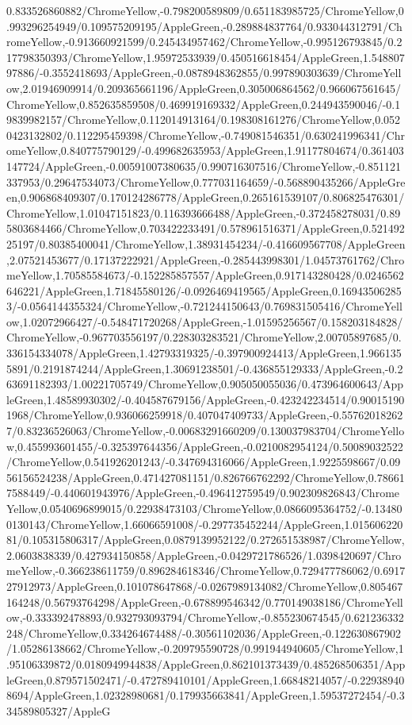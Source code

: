 {\begin{tikzternal}
0.833526860882/ChromeYellow,-0.798200589809/0.651183985725/ChromeYellow,0.993296254949/0.109575209195/AppleGreen,-0.289884837764/0.933044312791/ChromeYellow,-0.913660921599/0.245434957462/ChromeYellow,-0.995126793845/0.217798350393/ChromeYellow,1.95972533939/0.450516618454/AppleGreen,1.54880797886/-0.3552418693/AppleGreen,-0.0878948362855/0.997890303639/ChromeYellow,2.01946909914/0.209365661196/AppleGreen,0.305006864562/0.966067561645/ChromeYellow,0.852635859508/0.469919169332/AppleGreen,0.244943590046/-0.19839982157/ChromeYellow,0.112014913164/0.198308161276/ChromeYellow,0.0520423132802/0.112295459398/ChromeYellow,-0.749081546351/0.630241996341/ChromeYellow,0.840775790129/-0.499682635953/AppleGreen,1.91177804674/0.361403147724/AppleGreen,-0.00591007380635/0.990716307516/ChromeYellow,-0.851121337953/0.29647534073/ChromeYellow,0.777031164659/-0.568890435266/AppleGreen,0.906868409307/0.170124286778/AppleGreen,0.265161539107/0.806825476301/ChromeYellow,1.01047151823/0.116393666488/AppleGreen,-0.372458278031/0.895803684466/ChromeYellow,0.703422233491/0.578961516371/AppleGreen,0.52149225197/0.80385400041/ChromeYellow,1.38931454234/-0.416609567708/AppleGreen,2.07521453677/0.17137222921/AppleGreen,-0.285443998301/1.04573761762/ChromeYellow,1.70585584673/-0.152285857557/AppleGreen,0.917143280428/0.0246562646221/AppleGreen,1.71845580126/-0.0926469419565/AppleGreen,0.169435062853/-0.0564144355324/ChromeYellow,-0.721244150643/0.769831505416/ChromeYellow,1.02072966427/-0.548471720268/AppleGreen,-1.01595256567/0.158203184828/ChromeYellow,-0.967703556197/0.228303283521/ChromeYellow,2.00705897685/0.336154334078/AppleGreen,1.42793319325/-0.397900924413/AppleGreen,1.9661355891/0.2191874244/AppleGreen,1.30691238501/-0.436855129333/AppleGreen,-0.263691182393/1.00221705749/ChromeYellow,0.905050055036/0.473964600643/AppleGreen,1.48589930302/-0.404587679156/AppleGreen,-0.423242234514/0.900151901968/ChromeYellow,0.936066259918/0.407047409733/AppleGreen,-0.557620182627/0.83236526063/ChromeYellow,-0.00683291660209/0.130037983704/ChromeYellow,0.455993601455/-0.325397644356/AppleGreen,-0.0210082954124/0.50089032522/ChromeYellow,0.541926201243/-0.347694316066/AppleGreen,1.9225598667/0.0956156524238/AppleGreen,0.471427081151/0.826766762292/ChromeYellow,0.786617588449/-0.440601943976/AppleGreen,-0.496412759549/0.902309826843/ChromeYellow,0.0540696899015/0.22938473103/ChromeYellow,0.0866095364752/-0.134800130143/ChromeYellow,1.66066591008/-0.297735452244/AppleGreen,1.01560622081/0.105315806317/AppleGreen,0.0879139952122/0.272651538987/ChromeYellow,2.0603838339/0.427934150858/AppleGreen,-0.0429721786526/1.0398420697/ChromeYellow,-0.366238611759/0.896284618346/ChromeYellow,0.729477786062/0.691727912973/AppleGreen,0.101078647868/-0.0267989134082/ChromeYellow,0.805467164248/0.56793764298/AppleGreen,-0.678899546342/0.770149038186/ChromeYellow,-0.333392478893/0.932793093794/ChromeYellow,-0.855230674545/0.621236332248/ChromeYellow,0.334264674488/-0.30561102036/AppleGreen,-0.122630867902/1.05286138662/ChromeYellow,-0.209795590728/0.991944940605/ChromeYellow,1.95106339872/0.0180949944838/AppleGreen,0.862101373439/0.485268506351/AppleGreen,0.879571502471/-0.472789410101/AppleGreen,1.66848214057/-0.229389408694/AppleGreen,1.02328980681/0.179935663841/AppleGreen,1.59537272454/-0.334589805327/AppleG
\end{tikzternal}}
